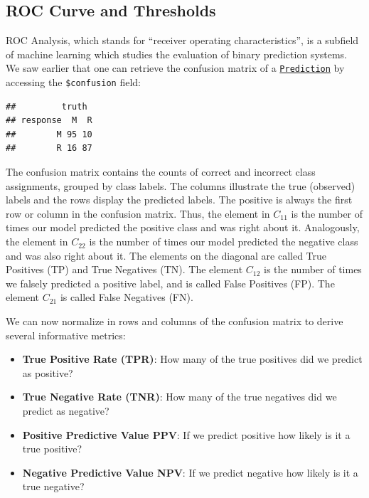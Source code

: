 \documentclass[
]{scrbook}
\newenvironment{Shaded}{\begin{snugshade}}{\end{snugshade}}
\newcommand{\AttributeTok}[1]{\textcolor[rgb]{0.77,0.63,0.00}{#1}}
\newcommand{\FunctionTok}[1]{\textcolor[rgb]{0.00,0.00,0.00}{#1}}
\newcommand{\NormalTok}[1]{#1}
\newcommand{\OtherTok}[1]{\textcolor[rgb]{0.56,0.35,0.01}{#1}}
\newcommand{\SpecialCharTok}[1]{\textcolor[rgb]{0.00,0.00,0.00}{#1}}
\newcommand{\StringTok}[1]{\textcolor[rgb]{0.31,0.60,0.02}{#1}}
\providecommand{\tightlist}{%
  \setlength{\itemsep}{0pt}\setlength{\parskip}{0pt}}
\renewenvironment{Shaded} {\begin{snugshade}\small} {\end{snugshade}}
\begin{document}
\hypertarget{binary-roc}{%
\subsection{ROC Curve and Thresholds}\label{binary-roc}}

ROC Analysis, which stands for ``receiver operating characteristics'', is a subfield of machine learning which studies the evaluation of binary prediction systems.
We saw earlier that one can retrieve the confusion matrix of a \href{https://mlr3.mlr-org.com/reference/Prediction.html}{\texttt{Prediction}} by accessing the \texttt{\$confusion} field:

\begin{Shaded}
\end{Shaded}

\begin{verbatim}
##         truth
## response  M  R
##        M 95 10
##        R 16 87
\end{verbatim}

The confusion matrix contains the counts of correct and incorrect class assignments, grouped by class labels.
The columns illustrate the true (observed) labels and the rows display the predicted labels.
The positive is always the first row or column in the confusion matrix.
Thus, the element in \(C_{11}\) is the number of times our model predicted the positive class and was right about it.
Analogously, the element in \(C_{22}\) is the number of times our model predicted the negative class and was also right about it.
The elements on the diagonal are called True Positives (TP) and True Negatives (TN).
The element \(C_{12}\) is the number of times we falsely predicted a positive label, and is called False Positives (FP).
The element \(C_{21}\) is called False Negatives (FN).

We can now normalize in rows and columns of the confusion matrix to derive several informative metrics:

\begin{itemize}
\tightlist
\item
  \textbf{True Positive Rate (TPR)}: How many of the true positives did we predict as positive?
\item
  \textbf{True Negative Rate (TNR)}: How many of the true negatives did we predict as negative?
\item
  \textbf{Positive Predictive Value PPV}: If we predict positive how likely is it a true positive?
\item
  \textbf{Negative Predictive Value NPV}: If we predict negative how likely is it a true negative?
\end{itemize}
\end{document}
